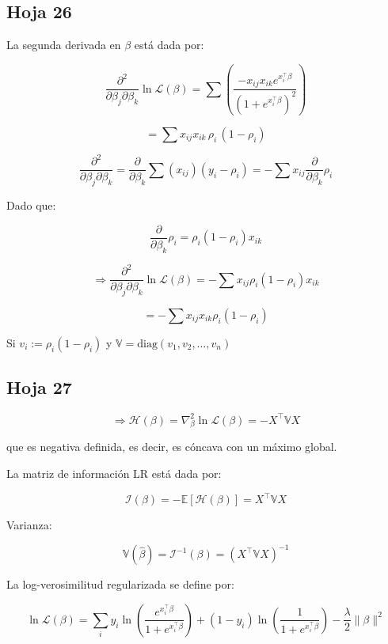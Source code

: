 \documentclass[12pt]{article}
\begin{document}
\subsection{Hoja 26}

La segunda derivada en \(\beta\) está dada por:

\[
\frac{\partial^2}{\partial \beta_j \partial \beta_k} \ln \mathcal{L}(\beta)
= \sum \left( \frac{-x_{ij} x_{ik} e^{x_i^\top \beta}}{(1 + e^{x_i^\top \beta})^2} \right)
\]

\[
= \sum x_{ij} x_{ik} \, \rho_i \, (1 - \rho_i)
\]

\[
\frac{\partial^2}{\partial \beta_j \partial \beta_k} = \frac{\partial}{\partial \beta_k} \sum (x_{ij}) (y_i - \rho_i)
= -\sum x_{ij} \frac{\partial}{\partial \beta_k} \rho_i
\]

Dado que:

\[
\frac{\partial}{\partial \beta_k} \rho_i = \rho_i (1 - \rho_i) x_{ik}
\]

\[
\Rightarrow \frac{\partial^2}{\partial \beta_j \partial \beta_k} \ln \mathcal{L}(\beta)
= -\sum x_{ij} \rho_i (1 - \rho_i) x_{ik}
\]

\[
= -\sum x_{ij} x_{ik} \rho_i (1 - \rho_i)
\]

\medskip

Si \( v_i := \rho_i (1 - \rho_i) \) y \( \mathbb{V} = \mathrm{diag}(v_1, v_2, \dots, v_n) \)

\subsection{Hoja 27}
\[
\Rightarrow \mathcal{H}(\beta) = \nabla^2_\beta \ln \mathcal{L}(\beta) = -X^\top \mathbb{V} X
\]

que es negativa definida, es decir, es cóncava con un máximo global.

\medskip

La matriz de información LR está dada por:

\[
\mathcal{I}(\beta) = -\mathbb{E}[\mathcal{H}(\beta)] = X^\top \mathbb{V} X
\]

Varianza:

\[
\mathbb{V}(\hat{\beta}) = \mathcal{I}^{-1}(\beta) = (X^\top \mathbb{V} X)^{-1}
\]

\medskip

La log-verosimilitud regularizada se define por:

\[
\ln \mathcal{L}(\beta) = \sum_i y_i \ln \left( \frac{e^{x_i^\top \beta}}{1 + e^{x_i^\top \beta}} \right) + (1 - y_i) \ln \left( \frac{1}{1 + e^{x_i^\top \beta}} \right)
- \frac{\lambda}{2} \| \beta \|^2
\]
\end{document}
